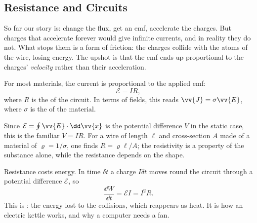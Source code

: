 \subsection{Resistance and Circuits}

So far our story is: change the flux, get an emf, accelerate the charges. But charges that accelerate forever would give infinite currents, and in reality they do not. What stops them is a form of friction: the charges collide with the atoms of the wire, losing energy. The upshot is that the emf ends up proportional to the charges' \emph{velocity} rather than their acceleration.

\begin{law}
	For most materials, the current is proportional to the applied emf:
	$$
	\mathcal{E} = IR,
	$$
	where $R$ is the  of the circuit. In terms of fields, this reads $\vv{J} = \sigma \vv{E}$, where $\sigma$ is the  of the material.
\end{law}

Since $\mathcal{E} = \oint \vv{E}\cdot \dd \vv{x}$ is the potential difference $V$ in the static case, this is the familiar $V = IR$. For a wire of length $\ell$ and cross-section $A$ made of a material of  $\varrho = 1/\sigma$, one finds $R = \varrho \ell /A$; the resistivity is a property of the substance alone, while the resistance depends on the shape.

Resistance costs energy. In time $\delta t$ a charge $I\delta t$ moves round the circuit through a potential difference $\mathcal{E}$, so
$$
\frac{\dd W}{\dd t} = \mathcal{E}I = I^2 R.
$$
This is : the energy lost to the collisions, which reappears as heat. It is how an electric kettle works, and why a computer needs a fan.

